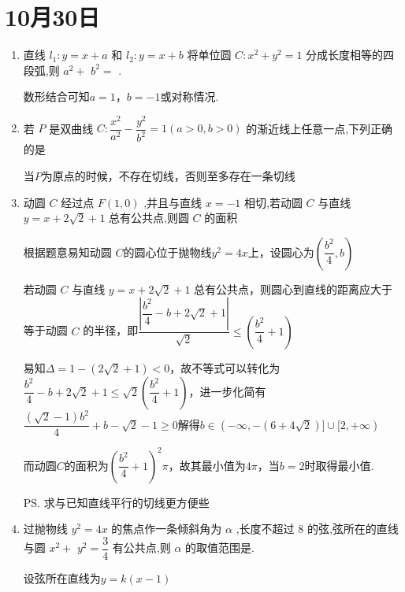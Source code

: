 \section*{10月30日}
\begin{enumerate}
    \item 直线 ${l}_{1} : y = x + a$ 和 ${l}_{2} : y = x + b$ 将单位圆 $C : {x}^{2} + {y}^{2} = 1$ 分成长度相等的四段弧,则 ${a}^{2} +$  ${b}^{2} =$ .
    \begin{jieda}
        数形结合可知$a = 1$，$b = -1$或对称情况.
    \end{jieda}
    \item 若 $P$ 是双曲线 $C : \dfrac{{x}^{2}}{{a}^{2}} - \dfrac{{y}^{2}}{{b}^{2}} = 1\left( {a > 0,b > 0}\right)$ 的渐近线上任意一点,下列正确的是
    \begin{jieda}
        当$P$为原点的时候，不存在切线，否则至多存在一条切线
    \end{jieda}
    \item 动圆 $C$ 经过点 $F\left( {1,0}\right)$ ,并且与直线 $x =  - 1$ 相切,若动圆 $C$ 与直线 $y = x + 2\sqrt{2} + 1$ 总有公共点,则圆 $C$ 的面积
    \begin{jieda}
        根据题意易知动圆 $C$的圆心位于抛物线$y^2 = 4x$上，设圆心为$\left(\dfrac{b^2}{4}, b\right)$
        
        若动圆 $C$ 与直线 $y = x + 2\sqrt{2} + 1$ 总有公共点，则圆心到直线的距离应大于等于动圆 $C$ 的半径，即$\dfrac{\left|\dfrac{b^2}{4} - b+2\sqrt{2}+1\right|}{\sqrt{2}} \leq \left(\dfrac{b^2}{4}+1\right)$

        易知$\Delta = 1 - (2\sqrt{2}+1) < 0$，故不等式可以转化为$\dfrac{b^2}{4} - b+2\sqrt{2}+1 \leq \sqrt{2}\left(\dfrac{b^2}{4}+1\right)$，进一步化简有$\dfrac{(\sqrt{2}-1)b^2}{4}+b-\sqrt{2} -1 \geq 0$解得$b \in (-\infty, -(6+4\sqrt{2})] \cup [2, +\infty)$

        而动圆$C$的面积为$\left(\dfrac{b^2}{4}+1\right)^2\pi$，故其最小值为$4\pi$，当$b = 2$时取得最小值.

        \ps 求与已知直线平行的切线更方便些
    \end{jieda}
    \item 过抛物线 ${y}^{2} = {4x}$ 的焦点作一条倾斜角为 $\alpha$ ,长度不超过 8 的弦,弦所在的直线与圆 ${x}^{2} +$  ${y}^{2} = \dfrac{3}{4}$ 有公共点,则 $\alpha$ 的取值范围是.
    \begin{jieda}
        设弦所在直线为$y = k(x-1)$
\end{jieda}
\end{enumerate}
